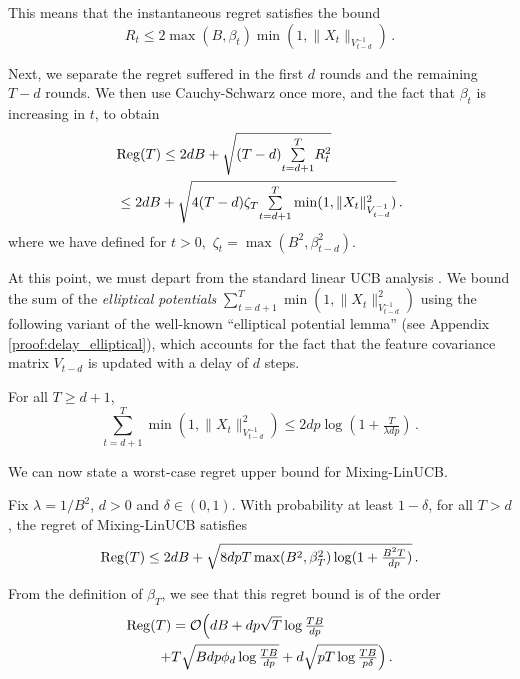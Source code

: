 This means that the instantaneous regret satisfies the bound
\begin{equation}
R_t \leq 2\max(B, \beta_{t})\min(1, \|X_t\|_{V_{t-d}^{-1}})\,.\label{eqn:inst_reg}
\end{equation}



Next, we separate the regret suffered in the first $d$ rounds and the remaining $T-d$ rounds. We then use Cauchy-Schwarz once more, and the fact that $\beta_{t}$ is increasing in $t$, to obtain
\begin{align*}
&\mathrm{Reg}(T) \leq 2dB + \sqrt{(T-d){\textstyle\sum\limits_{t=d+1}^{T}}R_t^2}\\
&\leq 2dB + \sqrt{4(T-d)\zeta_{T}{\textstyle\sum\limits_{t=d+1}^{T}}\min(1, \|X_t\|_{V_{t-d}^{-1}}^2)}\,.
\end{align*}
where we have defined for $t>0,$ $\zeta_t=\max(B^2, \beta_{t-d}^2).$



At this point, we must depart from the standard linear UCB analysis \citep{abbasi2011improved, lattimore2020bandit}. We bound the sum of the \emph{elliptical potentials} $\sum\limits_{t=d+1}^{T}\min(1, \|X_t\|_{V_{t-d}^{-1}}^2)$ using the following variant of the well-known ``elliptical potential lemma'' (see Appendix \ref{proof:delay_elliptical}), which accounts for the fact that the feature covariance matrix $V_{t-d}$ is updated with a delay of $d$ steps.
\begin{lemma}
For all $T \geq d+1$,
\begin{equation*}
\sum_{t=d+1}^{T}\min\left(1, \|X_t\|_{V_{t-d}^{-1}}^2\right) \leq 2dp\log(1 + \tfrac{T}{\lambda dp})\,.
\end{equation*}
\label{lem:delay_elliptical}
\end{lemma}

We can now state a worst-case regret upper bound for Mixing-LinUCB.



\begin{theorem}
\label{theorem:regret_bound}

Fix $\lambda = 1/B^2$, $d>0$ and $\delta\in(0,1)$. With probability at least $1 - \delta$, for all $T > d$, the regret of Mixing-LinUCB satisfies
\begin{align*}
\mathrm{Reg}(T) \leq 2dB + \sqrt{8dpT\max(B^2, \beta_{T}^2)\log(1 + \tfrac{B^2T}{dp})}\,.
\end{align*}
\label{thm:worst_case_reg}
\end{theorem}
From the definition of $\beta_T$, we see that this regret bound is of the order
\begin{align*}
\mathrm{Reg}(T)  &= \mathcal{O}\Big(dB + dp\sqrt{T}\log\tfrac{TB}{dp} \\+& T\sqrt{Bdp\phi_d\log\tfrac{TB}{dp}} + d\sqrt{pT\log\tfrac{TB}{p\delta}}\Big)\,.
\end{align*}


